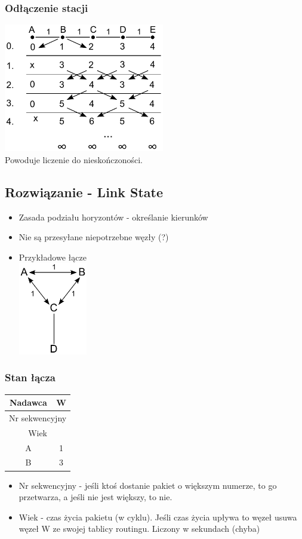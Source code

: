 			\subsubsection{Odłączenie stacji}
				\includegraphics[width=7.0cm]{./images/image43.pdf}\\
				Powoduje liczenie do nieskończoności.
		\subsection{Rozwiązanie - Link State}
			\begin{itemize}
				\item Zasada podziału horyzontów - określanie kierunków
				\item Nie są przesyłane niepotrzebne węzły (?)
				\item Przykładowe łącze\\
				\includegraphics[width=3.0cm]{./images/image44.pdf}
			\end{itemize}
			\subsubsection{Stan łącza}
				\begin{tabular}{|c|l|c|c|}
					\hline
					\multicolumn{3}{|c|}{Nadawca}           & W      \\ \hline
					\multicolumn{4}{|c|}{Nr sekwencyjny}             \\ \hline
					\multicolumn{4}{|c|}{Wiek}                       \\ \hline
					\multicolumn{3}{|c|}{A} & \multicolumn{1}{c|}{1} \\ \hline
					\multicolumn{3}{|c|}{B} & \multicolumn{1}{c|}{3} \\ \hline
				\end{tabular}
				\begin{itemize}
					\item Nr sekwencyjny - jeśli ktoś dostanie pakiet o większym numerze, to go przetwarza, a jeśli nie jest większy, to nie.
					\item Wiek - czas życia pakietu (w cyklu). Jeśli czas życia upływa to węzeł usuwa węzeł W ze swojej tablicy routingu. Liczony w sekundach (chyba)
				\end{itemize}
